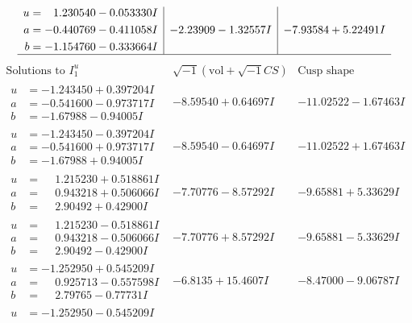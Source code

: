\documentclass[1p]{elsarticle_modified}
\theoremstyle{definition}
\newcommand{\I}{\sqrt{-1}}
\begin{document}
$$\begin{array}{c|c|c}
\begin{aligned}
u &= \phantom{-}1.230540 - 0.053330 I \\
a &= -0.440769 - 0.411058 I \\
b &= -1.154760 - 0.333664 I\end{aligned}
 & -2.23909 - 1.32557 I & -7.93584 + 5.22491 I\\
 \hline 
 \end{array}$$\newpage$$\begin{array}{c|c|c}  
\text{Solutions to }I^u_{1}& \I (\text{vol} + \sqrt{-1}CS) & \text{Cusp shape}\\
 \hline 
\begin{aligned}
u &= -1.243450 + 0.397204 I \\
a &= -0.541600 - 0.973717 I \\
b &= -1.67988 - 0.94005 I\end{aligned}
 & -8.59540 + 0.64697 I & -11.02522 - 1.67463 I \\ \hline\begin{aligned}
u &= -1.243450 - 0.397204 I \\
a &= -0.541600 + 0.973717 I \\
b &= -1.67988 + 0.94005 I\end{aligned}
 & -8.59540 - 0.64697 I & -11.02522 + 1.67463 I \\ \hline\begin{aligned}
u &= \phantom{-}1.215230 + 0.518861 I \\
a &= \phantom{-}0.943218 + 0.506066 I \\
b &= \phantom{-}2.90492 + 0.42900 I\end{aligned}
 & -7.70776 - 8.57292 I & -9.65881 + 5.33629 I \\ \hline\begin{aligned}
u &= \phantom{-}1.215230 - 0.518861 I \\
a &= \phantom{-}0.943218 - 0.506066 I \\
b &= \phantom{-}2.90492 - 0.42900 I\end{aligned}
 & -7.70776 + 8.57292 I & -9.65881 - 5.33629 I \\ \hline\begin{aligned}
u &= -1.252950 + 0.545209 I \\
a &= \phantom{-}0.925713 - 0.557598 I \\
b &= \phantom{-}2.79765 - 0.77731 I\end{aligned}
 & -6.8135 + 15.4607 I & -8.47000 - 9.06787 I \\ \hline\begin{aligned}
u &= -1.252950 - 0.545209 I \\

\end{aligned}
\end{array}$$
\end{document}
